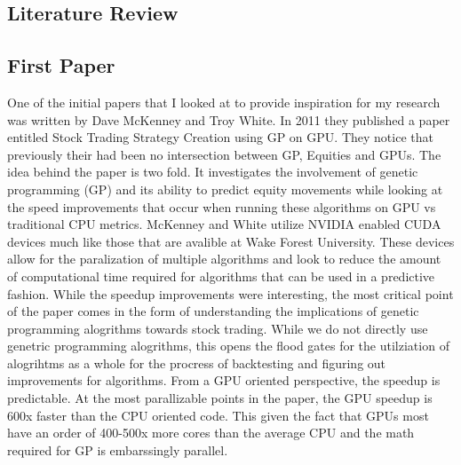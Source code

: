 \documentclass[paper=letter, fontsize=11pt]{scrartcl}
\numberwithin{equation}{section}		%
\numberwithin{figure}{section}			%
\numberwithin{table}{section}				%
\begin{document}
\begin{spacing}{2}
 \section{Literature Review}

\subsection{First Paper}

One of the initial papers that I looked at to provide inspiration for my research was written by Dave McKenney and Troy White. In 2011 they published a paper entitled Stock Trading Strategy Creation using GP on GPU. They notice that previously their had been no intersection between GP, Equities and GPUs. The idea behind the paper is two fold. It investigates the involvement of genetic programming (GP) and its ability to predict equity movements while looking at the speed improvements that occur when running these algorithms on GPU vs traditional CPU metrics. McKenney and White utilize NVIDIA enabled CUDA devices much like those that are avalible at Wake Forest University. These devices allow for the paralization of multiple algorithms and look to reduce the amount of computational time required for algorithms that can be used in a predictive fashion. While the speedup improvements were interesting, the most critical point of the paper comes in the form of understanding the implications of genetic programming alogrithms towards stock trading. While we do not directly use genetric programming alogrithms, this opens the flood gates for the utilziation of alogrihtms as a whole for the procress of backtesting and figuring out improvements for algorithms. From a GPU oriented perspective, the speedup is predictable. At the most parallizable points in the paper, the GPU speedup is 600x faster than the CPU oriented code. This given the fact that GPUs most have an order of 400-500x more cores than the average CPU and the math required for GP is embarssingly parallel. \cite{STS}


\end{spacing}
\end{document}
